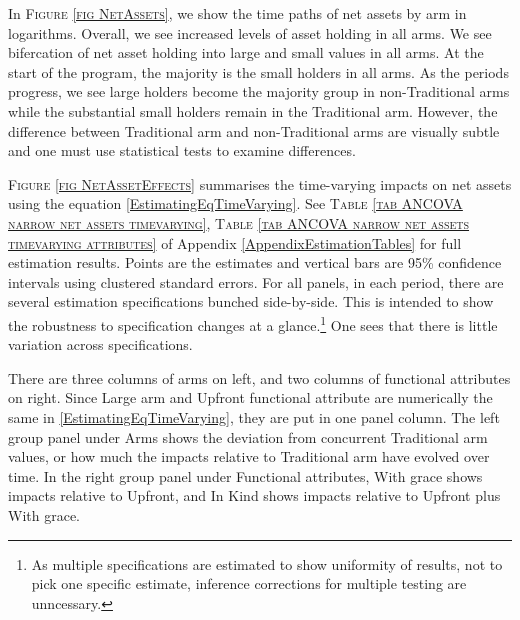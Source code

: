 	In \textsc{\footnotesize Figure \ref{fig NetAssets}}, we show the time paths of net assets by arm in logarithms. Overall, we see increased levels of asset holding in all arms. We see bifercation of net asset holding into large and small values in all arms. At the start of the program, the majority is the small holders in all arms. As the periods progress, we see large holders become the majority group in non-\textsf{Traditional} arms while the substantial small holders remain in the \textsf{Traditional} arm. However, the difference between \textsf{Traditional} arm and non-\textsf{Traditional} arms are visually subtle and one must use statistical tests to examine differences. %

	\textsc{\footnotesize Figure \ref{fig NetAssetEffects}} summarises the time-varying impacts on net assets using the equation \eqref{EstimatingEqTimeVarying}.  See \textsc{\footnotesize Table \ref{tab ANCOVA narrow net assets timevarying}}, \textsc{\footnotesize Table \ref{tab ANCOVA narrow net assets timevarying attributes}} of Appendix \ref{AppendixEstimationTables} for full estimation results. Points are the estimates and vertical bars are 95\% confidence intervals using clustered standard errors. For all panels, in each period, there are several estimation specifications bunched side-by-side. This is intended to show the robustness to specification changes at a glance.\footnote{As multiple specifications are estimated to show uniformity of results, not to pick one specific estimate, inference corrections for multiple testing are unncessary. } One sees that there is little variation across specifications. %
	
	There are three columns of arms on left, and two columns of functional attributes on right. Since \textsf{Large} arm and \textsf{Upfront} functional attribute are numerically the same in \eqref{EstimatingEqTimeVarying}, they are put in one panel column. The left group panel under \textsf{Arms} shows the deviation from concurrent \textsf{Traditional} arm values, or how much the impacts relative to \textsf{Traditional} arm have evolved over time. In the right group panel under \textsf{Functional attributes}, \textsf{With grace} shows impacts relative to \textsf{Upfront}, and \textsf{In Kind} shows impacts relative to \textsf{Upfront} plus \textsf{With grace}. 

